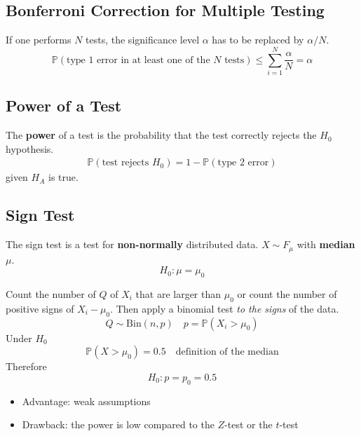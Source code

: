 \subsection{Bonferroni Correction for Multiple Testing}\label{bonferroni_correction}
If one performs $N$ tests, the significance level $\alpha$ has to be replaced by $\alpha/N$.
\begin{equation*}
    \mathbb{P}(\text{type 1 error in at least one of the }N\text{ tests}) \leq \sum_{i=1}^{N}\frac{\alpha}{N}=\alpha
\end{equation*}

\subsection{Power of a Test}
The \textbf{power} of a test is the probability that the test correctly rejects the $H_0$ hypothesis.
\begin{gather*}
    \mathbb{P}(\text{test rejects }H_0) = 1-\mathbb{P}(\text{type 2 error})
\end{gather*}
given $H_A$ is true. %

\subsection{Sign Test}
The sign test is a test for \textbf{non-normally} distributed data.
\newpar{}
$X \sim F_\mu$ with \textbf{median} $\mu$.
\newpar{}
\begin{equation*}
    H_0:\mu = \mu_0
\end{equation*}
\newpar{}

Count the number of $Q$ of $X_i$ that are larger than $\mu_0$ or count the number of positive signs of $X_i-\mu_0$. Then apply a binomial test \textit{to the signs} of the data.
\begin{equation*}
    Q \sim \text{Bin}(n,p) \quad p=\mathbb{P}(X_i > \mu_0)
\end{equation*}
Under $H_0$
\begin{equation*}
    \mathbb{P}(X > \mu_0)=0.5 \quad \text{definition of the median}
\end{equation*}
Therefore
\begin{equation*}
    H_0: p=p_0=0.5
\end{equation*}

\newpar{}
\begin{itemize}
    \item Advantage: weak assumptions
    \item Drawback: the power is low compared to the $Z$-test or the $t$-test
\end{itemize}

